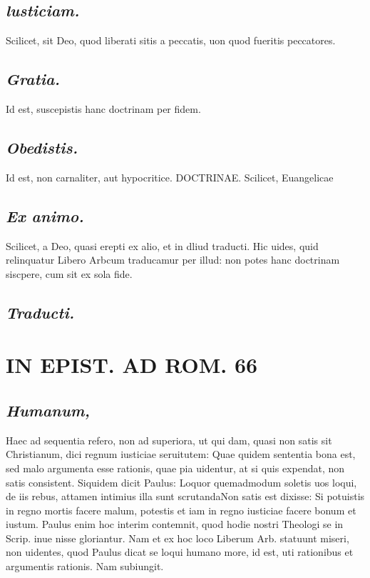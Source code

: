 \documentclass{article}
\begin{document}
\begin{pages}
\subsection*{\textit{lusticiam. }}\pstart Scilicet, sit Deo, quod liberati sitis a peccatis, uon quod fueritis peccatores.   \pend
{}
{}
\subsection*{\textit{Gratia. }}\pstart Id est, suscepistis hanc doctrinam per fidem.   \pend
{}
{}
\subsection*{\textit{Obedistis. }}\pstart Id est, non carnaliter, aut hypocritice. DOCTRINAE. Scilicet, Euangelicae\pend
{}
{}
\subsection*{\textit{Ex animo. }}\pstart Scilicet, a Deo, quasi erepti ex alio, et in dliud traducti. Hic uides, quid relinquatur Libero Arbcum traducamur per illud: non potes hanc doctrinam siscpere, cum sit ex sola fide.   \pend
{}
{}
\subsection*{\textit{Traducti. }}
\section*{IN EPIST. AD ROM.  66 }
\marginpar{[ p.]}
{}
\subsection*{\textit{Humanum, }}\pstart Haec ad sequentia refero, non ad superiora, ut qui dam, quasi non satis sit Christianum, dici regnum iusticiae seruitutem: Quae quidem sententia bona est, sed malo argumenta esse rationis, quae pia uidentur, at si quis expendat, non satis consistent. Siquidem dicit Paulus: Loquor quemadmodum soletis uos loqui, de iis rebus, attamen intimius illa sunt scrutandaNon satis est dixisse: Si potuistis in regno mortis facere malum, potestis et iam in regno iusticiae facere bonum et iustum. Paulus enim hoc interim contemnit, quod hodie nostri Theologi se in Scrip. inue nisse gloriantur. Nam et ex hoc loco Liberum Arb.  statuunt miseri, non uidentes, quod Paulus dicat se loqui humano more, id est, uti rationibus et argumentis rationis. Nam subiungit.  \pend
{}
{}

\end{pages}
\end{document}
